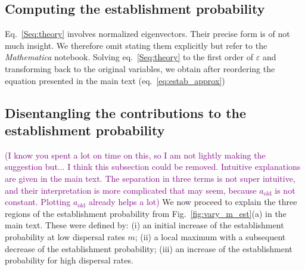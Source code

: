 \documentclass[11pt]{article}
\newcommand{\florence}[1]{\textcolor{purple}{(#1)}} %
\newcommand{\chg}[1]{\textcolor{change}{#1}}
\begin{document}

\subsection{Computing the establishment probability}
Eq.~\eqref{Seq:theory} involves normalized eigenvectors. Their precise form is of not much insight. We therefore omit stating them explicitly but refer to the \textit{Mathematica} notebook. Solving eq.~\eqref{Seq:theory} to the first order of $\varepsilon$ and transforming back to the original variables, we obtain after reordering the equation presented in the main text (eq.~\eqref{eq:estab_approx})

\subsection{Disentangling the contributions to the establishment probability\label{sec:SI_contributions}}

\florence{I know you spent a lot on time on this, so I am not lightly making the suggestion but... I think this subsection could be removed. Intuitive explanations are given in the main text. The separation in three terms is not super intuitive, and their interpretation is more complicated that may seem, because $a_{\text{old}}$ is not constant. Plotting $a_{\text{old}}$ already helps a lot}
\chg{We now proceed to explain} the three regions of the establishment probability from Fig.~\ref{fig:vary_m_est}(a) in the main text. These were defined by: (i) an initial increase of the establishment probability at low dispersal rates $m$; (ii) a local maximum with a subsequent decrease of the establishment probability; (iii) an increase of the establishment probability for high dispersal rates. 
\end{document}
